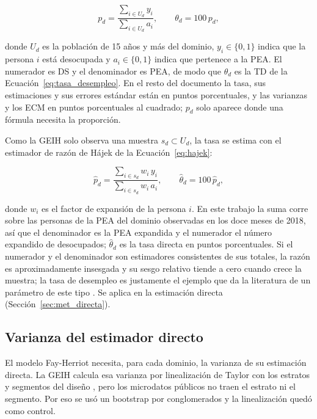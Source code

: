\begin{equation}
    p_d = \frac{\sum_{i \in U_d} y_i}{\sum_{i \in U_d} a_i}, \qquad \theta_d = 100\, p_d,
    \label{eq:tasa_poblacional}
\end{equation}

donde $U_d$ es la población de 15 años y más del dominio, $y_i \in \{0,1\}$ indica que la persona $i$ está desocupada y $a_i \in \{0,1\}$ indica que pertenece a la PEA. El numerador es DS y el denominador es PEA, de modo que $\theta_d$ es la TD de la Ecuación~\ref{eq:tasa_desempleo}. En el resto del documento la tasa, sus estimaciones y sus errores estándar están en puntos porcentuales, y las varianzas y los ECM en puntos porcentuales al cuadrado; $p_d$ solo aparece donde una fórmula necesita la proporción.

Como la GEIH solo observa una muestra $s_d \subset U_d$, la tasa se estima con el estimador de razón de Hájek de la Ecuación~\ref{eq:hajek}:

\begin{equation}
    \hat{p}_d = \frac{\sum_{i \in s_d} w_i\, y_i}{\sum_{i \in s_d} w_i\, a_i}, \qquad \hat{\theta}_d = 100\, \hat{p}_d,
    \label{eq:hajek}
\end{equation}

donde $w_i$ es el factor de expansión de la persona $i$. En este trabajo la suma corre sobre las personas de la PEA del dominio observadas en los doce meses de 2018, así que el denominador es la PEA expandida y el numerador el número expandido de desocupados; $\hat{\theta}_d$ es la tasa directa en puntos porcentuales. Si el numerador y el denominador son estimadores consistentes de sus totales, la razón es aproximadamente insesgada y su sesgo relativo tiende a cero cuando crece la muestra; la tasa de desempleo es justamente el ejemplo que da la literatura de un parámetro de este tipo \cite[pp.~21--22]{morales2021smallarea}. Se aplica en la estimación directa (Sección~\ref{sec:met_directa}).

\subsection{Varianza del estimador directo}
\label{subsec:varianza-hajek}

El modelo Fay-Herriot necesita, para cada dominio, la varianza de su estimación directa. La GEIH calcula esa varianza por linealización de Taylor con los estratos y segmentos del diseño \cite[pp.~14--15]{DANE_GEIH_Metodologia2016}, pero los microdatos públicos no traen el estrato ni el segmento. Por eso se usó un bootstrap por conglomerados y la linealización quedó como control.

